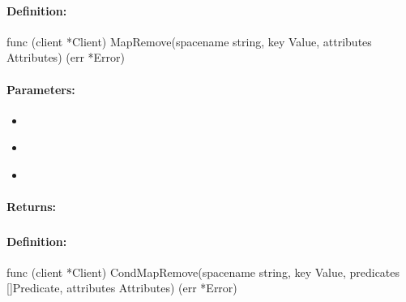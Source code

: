 \paragraph{Definition:}
\begin{gocode}
func (client *Client) MapRemove(spacename string, key Value, attributes Attributes) (err *Error)
\end{gocode}

\paragraph{Parameters:}
\begin{itemize}[noitemsep]
\item {}\\

\item {}\\

\item {}\\

\end{itemize}

\paragraph{Returns:}


\pagebreak
\subsubsection{}
\label{api:Go:CondMapRemove}


\paragraph{Definition:}
\begin{gocode}
func (client *Client) CondMapRemove(spacename string, key Value, predicates []Predicate, attributes Attributes) (err *Error)
\end{gocode}

